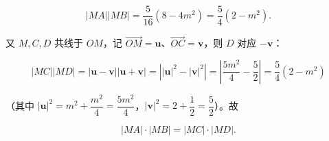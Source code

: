 \begin{answer}
\nopagebreak[4]
\[
|MA||MB|=\frac{5}{16}\left(8-4m^{2}\right)=\frac{5}{4}(2-m^{2}).
\]

又 \(M,C,D\) 共线于 \(OM\)，记 \(\overrightarrow{OM}=\boldsymbol u\)、\(\overrightarrow{OC}=\boldsymbol v\)，则 \(D\) 对应 \(-\boldsymbol v\)：

\nopagebreak[4]
\[
|MC||MD|=|\boldsymbol u-\boldsymbol v||\boldsymbol u+\boldsymbol v|=\left||\boldsymbol u|^{2}-|\boldsymbol v|^{2}\right|
=\left|\frac{5m^{2}}{4}-\frac{5}{2}\right|=\frac{5}{4}(2-m^{2})
\]

（其中 \(|\boldsymbol u|^{2}=m^{2}+\dfrac{m^{2}}{4}=\dfrac{5m^{2}}{4}\)，\(|\boldsymbol v|^{2}=2+\dfrac{1}{2}=\dfrac{5}{2}\)）。故

\nopagebreak[4]
\[
|MA|\cdot|MB|=|MC|\cdot|MD|.
\]



\end{answer}
